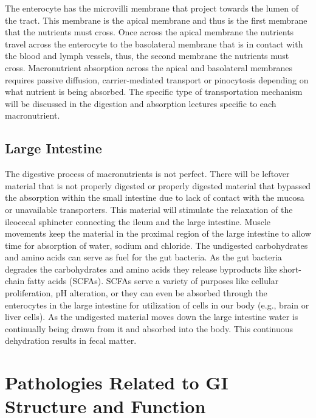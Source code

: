 \documentclass{tufte-handout}
\begin{document}
 The enterocyte has the microvilli membrane that project towards the lumen of the tract. This membrane is the apical membrane and thus is the first membrane that the nutrients must cross. Once across the apical membrane the nutrients travel across the enterocyte to the basolateral membrane that is in contact with the blood and lymph vessels, thus, the second membrane the nutrients must cross. Macronutrient absorption across the apical and basolateral membranes requires passive diffusion, carrier-mediated transport or pinocytosis depending on what nutrient is being absorbed. The specific type of transportation mechanism will be discussed in the digestion and absorption lectures specific to each macronutrient.

\subsection{Large Intestine}
The digestive process of macronutrients is not perfect. There will be leftover material that is not properly digested or properly digested material that bypassed the absorption within the small intestine due to lack of contact with the mucosa or unavailable transporters. This material will stimulate the relaxation of the ileocecal sphincter connecting the ileum and the large intestine. Muscle movements keep the material in the proximal region of the large intestine to allow time for absorption of water, sodium and chloride. The undigested carbohydrates and amino acids can serve as fuel for the gut bacteria. As the gut bacteria degrades the carbohydrates and amino acids they release byproducts like short-chain fatty acids (SCFAs). SCFAs serve a variety of purposes like cellular proliferation, pH alteration, or they can even be absorbed through the enterocytes in the large intestine for utilization of cells in our body (e.g., brain or liver cells). As the undigested material moves down the large intestine water is continually being drawn from it and absorbed into the body. This continuous dehydration results in fecal matter. 

\section{Pathologies Related to GI Structure and Function}
\end{document}
